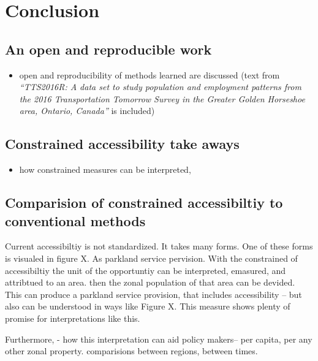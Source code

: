 \documentclass[
11pt, %
oneside, %
english, %
singlespacing, %
]{macthesis} %
\def\tightlist{}
\begin{document}
\chapter*{Conclusion}\label{conclusion-1}

\section{An open and reproducible work}\label{an-open-and-reproducible-work}

\begin{itemize}
\tightlist
\item
  open and reproducibility of methods learned are discussed (text from \emph{``TTS2016R: A data set to study population and employment patterns from the 2016 Transportation Tomorrow Survey in the Greater Golden Horseshoe area, Ontario, Canada''} is included)
\end{itemize}

\section{Constrained accessibility take aways}\label{constrained-accessibility-take-aways}

\begin{itemize}
\tightlist
\item
  how constrained measures can be interpreted,
\end{itemize}

\section{Comparision of constrained accessibiltiy to conventional methods}\label{comparision-of-constrained-accessibiltiy-to-conventional-methods}

Current accessibiltiy is not standardized. It takes many forms. One of these forms is visualed in figure X. As parkland service pervision. With the constrained of accessibiltiy the unit of the opportuntiy can be interpreted, emasured, and attribtued to an area. then the zonal population of that area can be devided. This can produce a parkland service provision, that includes accessibility -- but also can be understood in ways like Figure X. This measure shows plenty of promise for interpretations like this.

Furthermore,
- how this interpretation can aid policy makers-- per capita, per any other zonal property. comparisions between regions, between times.
\end{document}
